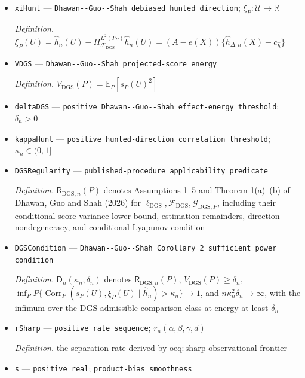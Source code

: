 \documentclass{article}
\begin{document}
\begin{itemize}
  \item \texttt{xiHunt} --- \texttt{Dhawan-\allowbreak{}-\allowbreak{}Guo-\allowbreak{}-\allowbreak{}Shah debiased hunted direction}; \(\xi_P:\mathcal U\to\mathbb R\)
  \par\smallskip\noindent\emph{Definition.} \(\xi_P(U)=\widehat h_n(U)-\Pi_{\mathcal F_{\mathrm{DGS}}}^{L^2(P_U)}\widehat h_n(U)=(A-e(X))\{\widehat h_{\Delta,n}(X)-c_{\widehat h}\}\)
  \item \texttt{VDGS} --- \texttt{Dhawan-\allowbreak{}-\allowbreak{}Guo-\allowbreak{}-\allowbreak{}Shah projected-\allowbreak{}score energy}
  \par\smallskip\noindent\emph{Definition.} \(V_{\mathrm{DGS}}(P)=\mathbb E_P[s_P(U)^2]\)
  \item \texttt{deltaDGS} --- \texttt{positive Dhawan-\allowbreak{}-\allowbreak{}Guo-\allowbreak{}-\allowbreak{}Shah effect-\allowbreak{}energy threshold}; \(\delta_n>0\)
  \item \texttt{kappaHunt} --- \texttt{positive hunted-\allowbreak{}direction correlation threshold}; \(\kappa_n\in(0,1]\)
  \item \texttt{DGSRegularity} --- \texttt{published-\allowbreak{}procedure applicability predicate}
  \par\smallskip\noindent\emph{Definition.} \(\mathsf R_{\mathrm{DGS},n}(P)\) denotes Assumptions 1--5 and Theorem 1(a)--(b) of Dhawan, Guo and Shah (2026) for \(\ell_{\mathrm{DGS}},\mathcal F_{\mathrm{DGS}},\mathcal G_{\mathrm{DGS},P}\), including their conditional score-variance lower bound, estimation remainders, direction nondegeneracy, and conditional Lyapunov condition
  \item \texttt{DGSCondition} --- \texttt{Dhawan-\allowbreak{}-\allowbreak{}Guo-\allowbreak{}-\allowbreak{}Shah Corollary 2 sufficient power condition}
  \par\smallskip\noindent\emph{Definition.} \(\mathsf D_n(\kappa_n,\delta_n)\) denotes \(\mathsf R_{\mathrm{DGS},n}(P)\), \(V_{\mathrm{DGS}}(P)\ge\delta_n\), \(\inf_P P\{\operatorname{Corr}_P(s_P(U),\xi_P(U)\mid\widehat h_n)>\kappa_n\}\to1\), and \(n\kappa_n^2\delta_n\to\infty\), with the infimum over the DGS-admissible comparison class at energy at least \(\delta_n\)
  \item \texttt{rSharp} --- \texttt{positive rate sequence}; \(r_n(\alpha,\beta,\gamma,d)\)
  \par\smallskip\noindent\emph{Definition.} the separation rate derived by \(\mathrm{oeq:sharp\mbox{-}observational\mbox{-}frontier}\)
  \item \texttt{s} --- \texttt{positive real}; \texttt{product-\allowbreak{}bias smoothness}

\end{itemize}
\end{document}

